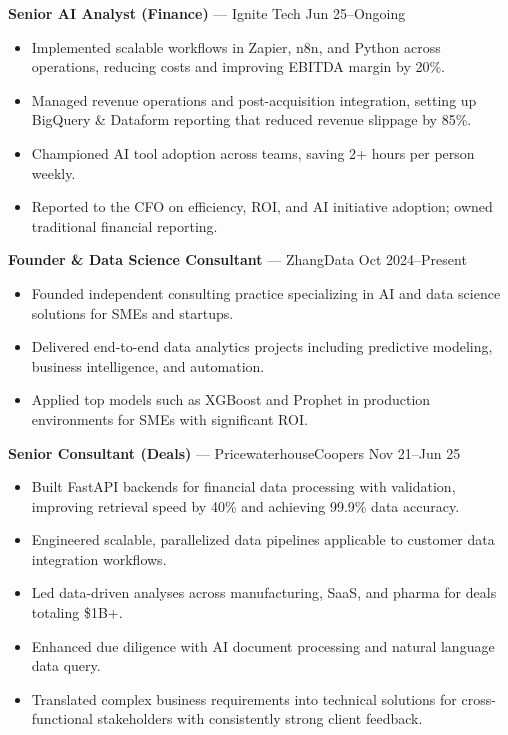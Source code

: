 \documentclass[10pt,letterpaper]{article}
\begin{document}
\begin{samepage}
\textbf{Senior AI Analyst (Finance)} — Ignite Tech \hfill Jun 25--Ongoing\\[-1.1em]
\begin{itemize}
  \item Implemented scalable workflows in Zapier, n8n, and Python across operations, reducing costs and improving EBITDA margin by 20\%.
  \item Managed revenue operations and post-acquisition integration, setting up BigQuery \& Dataform reporting that reduced revenue slippage by 85\%.
  \item Championed AI tool adoption across teams, saving 2+ hours per person weekly.
  \item Reported to the CFO on efficiency, ROI, and AI initiative adoption; owned traditional financial reporting.
\end{itemize}
\end{samepage}

\begin{samepage}
\textbf{Founder \& Data Science Consultant} — ZhangData \hfill Oct 2024--Present\\[-1.1em]
\begin{itemize}
  \item Founded independent consulting practice specializing in AI and data science solutions for SMEs and startups.
  \item Delivered end-to-end data analytics projects including predictive modeling, business intelligence, and automation.
  \item Applied top models such as XGBoost and Prophet in production environments for SMEs with significant ROI.
\end{itemize}
\end{samepage}

\begin{samepage}
\textbf{Senior Consultant (Deals)} — PricewaterhouseCoopers \hfill Nov 21--Jun 25\\[-1.1em]
\begin{itemize}
  \item Built FastAPI backends for financial data processing with validation, improving retrieval speed by 40\% and achieving 99.9\% data accuracy.
  \item Engineered scalable, parallelized data pipelines applicable to customer data integration workflows.
  \item Led data-driven analyses across manufacturing, SaaS, and pharma for deals totaling \$1B+.
  \item Enhanced due diligence with AI document processing and natural language data query.
  \item Translated complex business requirements into technical solutions for cross-functional stakeholders with consistently strong client feedback.
\end{itemize}
\end{samepage}
\end{document}
